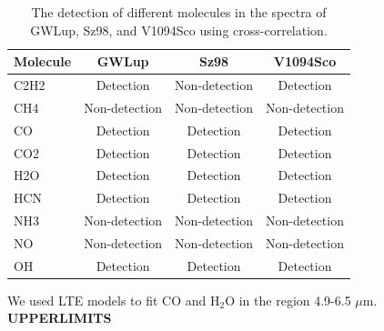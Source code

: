 \documentclass[twoside, single, authoryear, semicolon]{lion-msc}
\newcommand{\4}{$_4$}
\newcommand{\3}{$_3$}
\newcommand{\2}{$_2$}
\begin{document}
\begin{table}[!ht]
\centering
\begin{tabular}{|l|ccc|}
\hline
\textbf{Molecule} & \textbf{GWLup} & \textbf{Sz98} & \textbf{V1094Sco} \\ \hline
C2H2            & Detection      & Non-detection & Detection         \\
CH4             & Non-detection  & Non-detection & Non-detection     \\
CO              & Detection      & Detection     & Detection         \\
CO2             & Detection      & Detection     & Detection         \\
H2O             & Detection      & Detection     & Detection         \\
HCN             & Detection      & Detection     & Detection         \\
NH3             & Non-detection  & Non-detection & Non-detection     \\
NO              & Non-detection  & Non-detection & Non-detection     \\
OH              & Detection      & Detection     & Detection         \\ \hline
\end{tabular}

\caption{The detection of different molecules in the spectra of GWLup, Sz98, and V1094Sco using cross-correlation.}
\label{tab: realdata}
\end{table}


We used LTE models to fit CO and H\2O in the region 4.9-6.5 $\mu$m.
\textbf{UPPERLIMITS}
\end{document}
